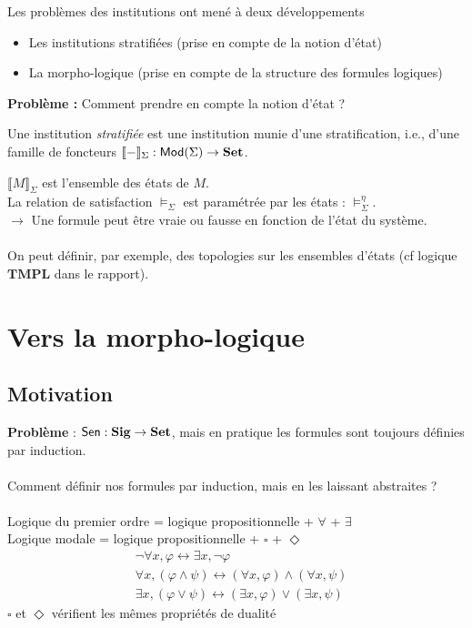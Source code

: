 \documentclass{beamer}
\newcommand{\gr}{\textbf}
\newcommand{\info}[1]{\text{{\fontfamily{lmss}\selectfont #1}}}
\newcommand{\Mod}{\info{Mod}}
\newcommand{\Sen}{\info{Sen}}
\newcommand{\itemz}{\item[$\triangleright$]}
\begin{document}
\begin{frame}

Les problèmes des institutions ont mené à deux développements
\begin{itemize}
\itemz Les institutions stratifiées (prise en compte de la notion d'état) \cite{Aig07}
\itemz La morpho-logique (prise en compte de la structure des formules logiques) \cite{Aig17}
\end{itemize}
\end{frame}


\begin{frame}
\textbf{Problème :} Comment prendre en compte la notion d'état ? \pause
\begin{definition}[Stratification]
Une institution \textit{stratifiée} est une institution munie d'une stratification, i.e., d'une famille de foncteurs $\llbracket - \rrbracket_\Sigma : \Mod(\Sigma) \to \gr{Set}$.
\end{definition}
$\llbracket M \rrbracket_\Sigma$ est l'ensemble des états de $M$. \\
\pause
La relation de satisfaction $\models_\Sigma$ est paramétrée par les états : $\models_\Sigma^\eta$.\\
$\longrightarrow$ Une formule peut être vraie ou fausse en fonction de l'état du système. \\~\\
On peut définir, par exemple, des topologies sur les ensembles d'états (cf logique $\textbf{TMPL}$ dans le rapport).
\end{frame}

\section{Vers la morpho-logique}

\subsection{Motivation}
\begin{frame}
\gr{Problème} : $\Sen : \gr{Sig} \to \gr{Set}$, mais en pratique les formules sont toujours définies par induction.\\~\\ \pause
Comment définir nos formules par induction, mais en les laissant abstraites ? \pause \\~\\
Logique du premier ordre = logique propositionnelle + $\forall$ + $\exists$\\
Logique modale = logique propositionnelle + $\square$ + $\Diamond$\\ \pause
\begin{align*}
& \neg \forall x, \varphi \leftrightarrow \exists x, \neg \varphi \\
& \forall x, (\varphi \wedge \psi) \leftrightarrow (\forall x, \varphi) \wedge (\forall x, \psi) \\
& \exists x, (\varphi \vee \psi) \leftrightarrow (\exists x, \varphi) \vee (\exists x, \psi)
\end{align*} \pause
$\square$ et $\Diamond$ vérifient les mêmes propriétés de dualité
\end{frame}
\end{document}
